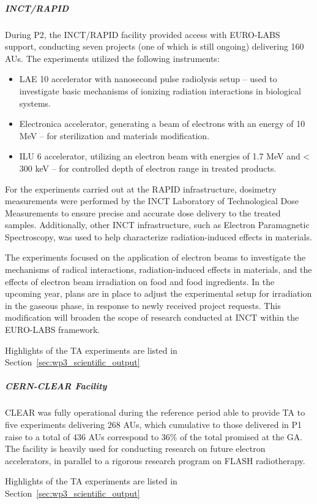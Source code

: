 {\subparagraph*{INCT/RAPID} 
During P2, the INCT/RAPID facility provided access with EURO-LABS support, conducting seven projects (one of which is still ongoing) delivering 160 AUs. The experiments utilized the following instruments:
\begin{itemize}
\item LAE 10 accelerator with nanosecond pulse radiolysis setup – used to investigate basic mechanisms of ionizing radiation interactions in biological systems.
\item Electronica accelerator, generating a beam of electrons with an energy of 10 MeV – for sterilization and materials modification.
\item ILU 6 accelerator, utilizing an electron beam with energies of 1.7 MeV and < 300 keV – for controlled depth of electron range in treated products.
\end{itemize}
For the experiments carried out at the RAPID infrastructure, dosimetry measurements were performed by the INCT Laboratory of Technological Dose Measurements to ensure precise and accurate dose delivery to the treated samples. Additionally, other INCT infrastructure, such as Electron Paramagnetic Spectroscopy, was used to help characterize radiation-induced effects in materials.

The experiments focused on the application of electron beams to investigate the mechanisms of radical interactions, radiation-induced effects in materials, and the effects of electron beam irradiation on food and food ingredients. In the upcoming year, plans are in place to adjust the experimental setup for irradiation in the gaseous phase, in response to newly received project requests. This modification will broaden the scope of research conducted at INCT within the EURO-LABS framework.

Highlights of the TA experiments are listed in Section~\ref{sec:wp3_scientific_output}


\subparagraph*{CERN-CLEAR Facility}

CLEAR was fully operational during the reference period able to provide TA to five experiments delivering 268 AUs, which cumulative to those delivered in P1 raise to a total of 436 AUs correspond to 36\% of the total promised at the GA. 
The facility is heavily used for conducting research on future electron accelerators, in parallel to a rigorous research program on FLASH radiotherapy. 

Highlights of the TA experiments are listed in Section~\ref{sec:wp3_scientific_output}

}
